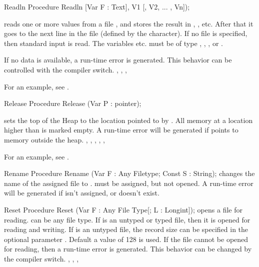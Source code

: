 \documentclass{report}
\begin{document}
\begin{procedure}{Readln}
\Declaration
Procedure Readln [Var F : Text], V1 [, V2, ... , Vn]);

\Description
{} reads one or more values from a file , and stores the
result in , , etc. After that it goes to the next line in
the file (defined by the  character).
If no file  is specified, then standard input is read.
The variables  etc. must be of type , ,
,  or .

\Errors
If no data is available, a run-time error is generated. This behavior can
be controlled with the  compiler switch.
\SeeAlso
{}, , , 
\end{procedure}
For an example, see .
\begin{procedure}{Release}
\Declaration
Procedure Release (Var P : pointer);

\Description
{} sets the top of the Heap to the location pointed to by
. All memory at a location higher than  is marked empty.
\Errors
A run-time error will be generated if  points to memory outside the
heap.
\SeeAlso
{}, , , , 
, 
\end{procedure}
For an example, see .
\begin{procedure}{Rename}
\Declaration
Procedure Rename (Var F : Any Filetype; Const S : String);
\Description
{} changes the name of the assigned file  to .
must be assigned, but not opened.
\Errors
A run-time error will be generated if  isn't assigned,
or doesn't exist.
\SeeAlso
{}
\end{procedure}


\begin{procedure}{Reset}
\Declaration
Procedure Reset (Var F : Any File Type[; L : Longint]);
\Description
{} opens a file  for reading.  can be any file type.
If  is an untyped or typed file, then it is opened for reading and
writing. If  is an untyped file, the record size can be specified in
the optional parameter . Default a value of 128 is used.
\Errors
If the file cannot be opened for reading, then a run-time error is
generated. This behavior can be changed by the  compiler switch.
\SeeAlso
{}, , , 
\end{procedure}
\end{document}
